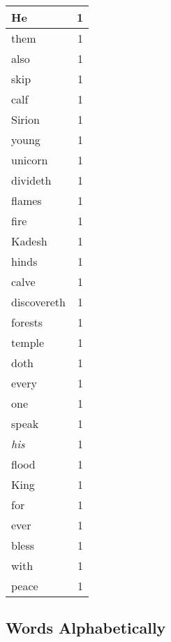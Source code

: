 \begin{center}
\begin{longtable}{l|r}
He & 1 \\ \hline
them & 1 \\ \hline
also & 1 \\ \hline
skip & 1 \\ \hline
calf & 1 \\ \hline
Sirion & 1 \\ \hline
young & 1 \\ \hline
unicorn & 1 \\ \hline
divideth & 1 \\ \hline
flames & 1 \\ \hline
fire & 1 \\ \hline
Kadesh & 1 \\ \hline
hinds & 1 \\ \hline
calve & 1 \\ \hline
discovereth & 1 \\ \hline
forests & 1 \\ \hline
temple & 1 \\ \hline
doth & 1 \\ \hline
every & 1 \\ \hline
one & 1 \\ \hline
speak & 1 \\ \hline
\emph{his} & 1 \\ \hline
flood & 1 \\ \hline
King & 1 \\ \hline
for & 1 \\ \hline
ever & 1 \\ \hline
bless & 1 \\ \hline
with & 1 \\ \hline
peace & 1 \\ \hline
\end{longtable}
\end{center}



\normalsize



\subsection{Words Alphabetically}

